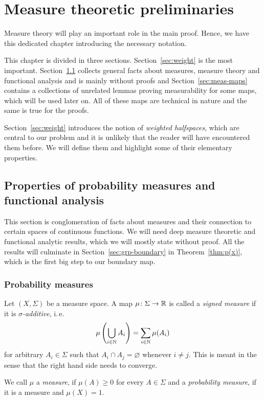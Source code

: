 \section{Measure theoretic preliminaries}
\label{sec:measure}

Measure theory will play an important role in the main proof. Hence, we have this dedicated chapter introducing the necessary notation.

This chapter is divided in three sections. Section~\ref{sec:weight} is the most important. Section~\ref{sec:prob} collects general facts about measures, measure theory and functional analysis and is main\-ly without proofs and Section~\ref{sec:meas-maps} contains a collections of unrelated lemmas proving measurability for some maps, which will be used later on. All of these maps are technical in nature and the same is true for the proofs.

Section~\ref{sec:weight} introduces the notion of \emph{weighted halfspaces}, which are central to our problem and it is unlikely that the reader will have encountered them before. We will define them and highlight some of their elementary properties.

\subsection{Properties of probability measures and functional analysis}
\label{sec:prob}

This section is conglomeration of facts about measures and their connection to certain spaces of continuous functions. We will need deep measure theoretic and functional analytic results, which we will mostly state without proof. All the results will culminate in Section~\ref{sec:grp-boundary} in Theorem~\ref{thm:p(x)}, which is the first big step to our boundary map.

\subsubsection*{Probability measures}
\label{sec:prob-measures}

\begin{defin}
  Let \((X, \Sigma)\) be a measure space. A map \(\mu \colon \Sigma \to \mathbb{R}\) is called a \emph{signed measure} if it is \emph{\(\sigma\)-additive}, i.\,e.
  \[
    \mu\left(\bigcup_{i \in \mathbb{N}}A_i \right) = \sum_{i \in \mathbb{N}} \mu(A_i)
  \]
  for arbitrary \(A_i \in \Sigma\) such that \(A_i \cap A_j = \varnothing\) whenever \(i \neq j\). This is meant in the sense that the right hand side needs to converge.

  We call \(\mu\) a \emph{measure}, if \(\mu(A) \geq 0\) for every \(A \in \Sigma\) and a \emph{probability measure}, if it is a measure and \(\mu(X) = 1\).
\end{defin}

